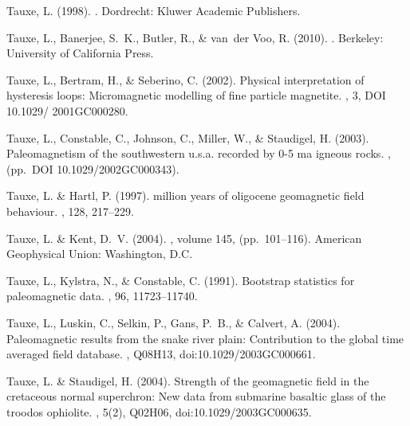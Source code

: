 \documentclass[11pt]{book}
\begin{document}
{{{{\begin{thebibliography}{}
Tauxe, L. (1998).
.
\newblock Dordrecht: Kluwer Academic Publishers.

Tauxe, L., Banerjee, S.~K., Butler, R., \& van~der Voo, R. (2010).
.
\newblock Berkeley: University of California Press.

Tauxe, L., Bertram, H., \& Seberino, C. (2002).
\newblock Physical interpretation of hysteresis loops: Micromagnetic modelling
  of fine particle magnetite.
, 3, DOI 10.1029/ 2001GC000280.

Tauxe, L., Constable, C., Johnson, C., Miller, W., \& Staudigel, H. (2003).
\newblock Paleomagnetism of the southwestern u.s.a. recorded by 0-5 ma igneous
  rocks.
, (pp.\ DOI 10.1029/2002GC000343).

Tauxe, L. \& Hartl, P. (1997).
 million years of oligocene geomagnetic field behaviour.
, 128, 217--229.

Tauxe, L. \& Kent, D.~V. (2004).
, volume 145, (pp.\ 101--116).
\newblock American Geophysical Union: Washington, D.C.

Tauxe, L., Kylstra, N., \& Constable, C. (1991).
\newblock Bootstrap statistics for paleomagnetic data.
, 96, 11723--11740.

Tauxe, L., Luskin, C., Selkin, P., Gans, P.~B., \& Calvert, A. (2004).
\newblock Paleomagnetic results from the snake river plain: Contribution to the
  global time averaged field database.
, Q08H13, doi:10.1029/2003GC000661.

Tauxe, L. \& Staudigel, H. (2004).
\newblock Strength of the geomagnetic field in the cretaceous normal
  superchron: New data from submarine basaltic glass of the troodos ophiolite.
, 5(2), Q02H06,
  doi:10.1029/2003GC000635.


\end{thebibliography}}}}}
\end{document}
